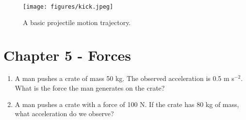 \documentclass{article}
\begin{document}
\begin{figure}
\centering
\texttt{[image: figures/kick.jpeg]}
\caption{\label{fig:1} A basic projectile motion trajectory.}
\end{figure}

\section{Chapter 5 - Forces}

\begin{enumerate}
\item A man pushes a crate of mass 50 kg.  The observed acceleration is 0.5 m s$^{-2}$.  What is the force the man generates on the crate? \\ \vspace{1cm}
\item A man pushes a crate with a force of 100 N.  If the crate has 80 kg of mass, what acceleration do we observe?
\end{enumerate}
\end{document}
